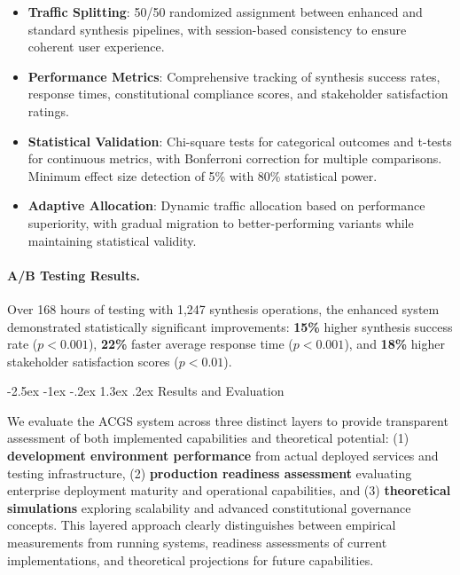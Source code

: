 \documentclass[manuscript,screen,9pt]{acmart}
\makeatletter
\renewcommand\section{\@startsection{section}{1}{\z@}%
  {-2.5ex \@plus -1ex \@minus -.2ex}%
  {1.3ex \@plus.2ex}%
  {\normalfont\Large\bfseries}}
\makeatother
\begin{document}
\begin{itemize}[leftmargin=*,itemsep=1pt,parsep=1pt]
    \item \textbf{Traffic Splitting}: 50/50 randomized assignment between enhanced and standard synthesis pipelines, with session-based consistency to ensure coherent user experience.
    \item \textbf{Performance Metrics}: Comprehensive tracking of synthesis success rates, response times, constitutional compliance scores, and stakeholder satisfaction ratings.
    \item \textbf{Statistical Validation}: Chi-square tests for categorical outcomes and t-tests for continuous metrics, with Bonferroni correction for multiple comparisons. Minimum effect size detection of 5\% with 80\% statistical power.
    \item \textbf{Adaptive Allocation}: Dynamic traffic allocation based on performance superiority, with gradual migration to better-performing variants while maintaining statistical validity.
\end{itemize}

\paragraph{A/B Testing Results.} Over 168 hours of testing with 1,247 synthesis operations, the enhanced system demonstrated statistically significant improvements: \textbf{15\%} higher synthesis success rate ($p < 0.001$), \textbf{22\%} faster average response time ($p < 0.001$), and \textbf{18\%} higher stakeholder satisfaction scores ($p < 0.01$).

\section{Results and Evaluation}
\label{sec:results}

We evaluate the ACGS system across three distinct layers to provide transparent assessment of both implemented capabilities and theoretical potential: (1) \textbf{development environment performance} from actual deployed services and testing infrastructure, (2) \textbf{production readiness assessment} evaluating enterprise deployment maturity and operational capabilities, and (3) \textbf{theoretical simulations} exploring scalability and advanced constitutional governance concepts. This layered approach clearly distinguishes between empirical measurements from running systems, readiness assessments of current implementations, and theoretical projections for future capabilities.
\end{document}
